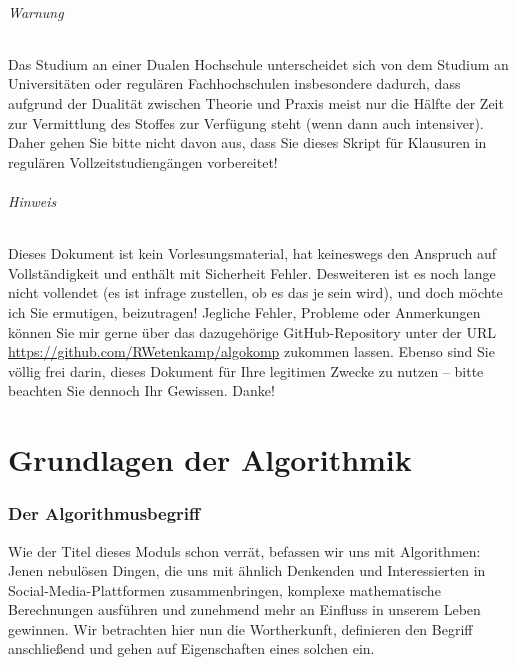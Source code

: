 \documentclass[11pt,a4paper]{scrartcl}
\begin{document}
\paragraph{Warnung}
Das Studium an einer Dualen Hochschule unterscheidet sich von dem Studium an Universitäten oder regulären Fachhochschulen insbesondere dadurch, dass aufgrund der Dualität zwischen Theorie und Praxis meist nur die Hälfte der Zeit zur Vermittlung des Stoffes zur Verfügung steht (wenn dann auch intensiver). Daher gehen Sie bitte nicht davon aus, dass Sie dieses Skript für Klausuren in regulären Vollzeitstudiengängen vorbereitet!
\paragraph{Hinweis}
Dieses Dokument ist kein Vorlesungsmaterial, hat keineswegs den Anspruch auf Vollständigkeit und enthält mit Sicherheit Fehler. Desweiteren ist es noch lange nicht vollendet (es ist infrage zustellen, ob es das je sein wird), und doch möchte ich Sie ermutigen, beizutragen! Jegliche Fehler, Probleme oder Anmerkungen können Sie mir gerne über das dazugehörige GitHub-Repository unter der URL \url{https://github.com/RWetenkamp/algokomp} zukommen lassen. Ebenso sind Sie völlig frei darin, dieses Dokument für Ihre legitimen Zwecke zu nutzen -- bitte beachten Sie dennoch Ihr Gewissen. Danke!
\pagebreak
\part{Grundlagen der Algorithmik}
\section{Der Algorithmusbegriff}
Wie der Titel dieses Moduls schon verrät, befassen wir uns mit Algorithmen: Jenen nebulösen Dingen, die uns mit ähnlich Denkenden und Interessierten in Social-Media-Plattformen zusammenbringen, komplexe mathematische Berechnungen ausführen und zunehmend mehr an Einfluss in unserem Leben gewinnen. Wir betrachten hier nun die Wortherkunft, definieren den Begriff anschließend und gehen auf Eigenschaften eines solchen ein.
\end{document}
